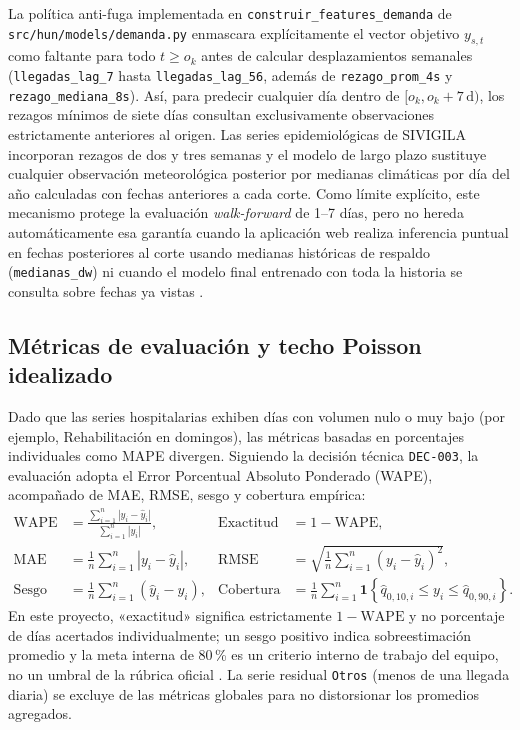 La política anti-fuga implementada en \texttt{construir\_features\_demanda} de \texttt{src/hun/models/demanda.py} enmascara explícitamente el vector objetivo $y_{s,t}$ como faltante para todo $t \ge o_k$ antes de calcular desplazamientos semanales (\texttt{llegadas\_lag\_7} hasta \texttt{llegadas\_lag\_56}, además de \texttt{rezago\_prom\_4s} y \texttt{rezago\_mediana\_8s}). Así, para predecir cualquier día dentro de $[o_k, o_k + 7\,\text{d})$, los rezagos mínimos de siete días consultan exclusivamente observaciones estrictamente anteriores al origen. Las series epidemiológicas de SIVIGILA incorporan rezagos de dos y tres semanas y el modelo de largo plazo sustituye cualquier observación meteorológica posterior por medianas climáticas por día del año calculadas con fechas anteriores a cada corte. Como límite explícito, este mecanismo protege la evaluación \textit{walk-forward} de 1--7 días, pero no hereda automáticamente esa garantía cuando la aplicación web realiza inferencia puntual en fechas posteriores al corte usando medianas históricas de respaldo (\texttt{medianas\_dw}) ni cuando el modelo final entrenado con toda la historia se consulta sobre fechas ya vistas \parencite{mediflow2026bundle,mediflow2026informe}.

\subsection{Métricas de evaluación y techo Poisson idealizado}

Dado que las series hospitalarias exhiben días con volumen nulo o muy bajo (por ejemplo, Rehabilitación en domingos), las métricas basadas en porcentajes individuales como MAPE divergen. Siguiendo la decisión técnica \texttt{DEC-003}, la evaluación adopta el Error Porcentual Absoluto Ponderado (WAPE), acompañado de MAE, RMSE, sesgo y cobertura empírica:
{\singlespacing
\begin{equation}
\label{eq:metricas}
\begin{aligned}
\text{WAPE} &= \frac{\sum_{i=1}^{n} |y_i - \hat{y}_i|}{\sum_{i=1}^{n} |y_i|}, &
\text{Exactitud} &= 1 - \text{WAPE}, \\
\text{MAE} &= \frac{1}{n}\sum_{i=1}^{n} |y_i - \hat{y}_i|, &
\text{RMSE} &= \sqrt{\frac{1}{n}\sum_{i=1}^{n} (y_i - \hat{y}_i)^2}, \\
\text{Sesgo} &= \frac{1}{n}\sum_{i=1}^{n} (\hat{y}_i - y_i), &
\text{Cobertura} &= \frac{1}{n}\sum_{i=1}^{n} \mathbf{1}\!\left\{\hat{q}_{0{,}10,i} \le y_i \le \hat{q}_{0{,}90,i}\right\}.
\end{aligned}
\end{equation}
}
En este proyecto, «exactitud» significa estrictamente $1 - \text{WAPE}$ y no porcentaje de días acertados individualmente; un sesgo positivo indica sobreestimación promedio y la meta interna de 80\,\% es un criterio interno de trabajo del equipo, no un umbral de la rúbrica oficial \parencite{mediflow2026demanda,hun2026terminos}. La serie residual \texttt{Otros} (menos de una llegada diaria) se excluye de las métricas globales para no distorsionar los promedios agregados.

